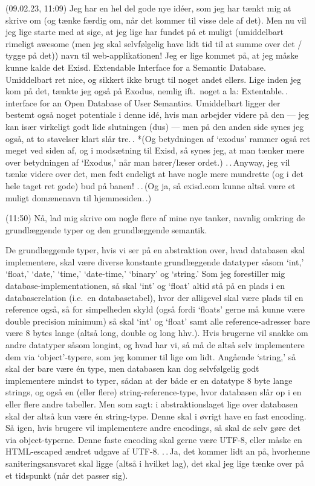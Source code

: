 \documentclass{report}
\begin{document}
(09.02.23, 11:09) Jeg har en hel del gode nye idéer, som jeg har tænkt mig at skrive om (og tænke færdig om, når det kommer til visse dele af det). Men nu vil jeg lige starte med at sige, at jeg lige har fundet på et muligt (umiddelbart rimeligt awesome (men jeg skal selvfølgelig have lidt tid til at summe over det / tygge på det)) navn til web-applikationen! Jeg er lige kommet på, at jeg måske kunne kalde det Exisd. Extendable Interface for a Semantic Database. Umiddelbart ret nice, og sikkert ikke brugt til noget andet ellers. Lige inden jeg kom på det, tænkte jeg også på Exodus, nemlig ift.\ noget a la: Extentable.\,. interface for an Open Database of User Semantics. Umiddelbart ligger der bestemt også noget potentiale i denne idé, hvis man arbejder videre på den --- jeg kan især virkeligt godt lide slutningen (dus) --- men på den anden side synes jeg også, at to stavelser klart slår tre.\,. *(Og betydningen af `exodus' rammer også ret meget ved siden af, og i modsætning til Exisd, så synes jeg, at man tænker mere over betydningen af `Exodus,' når man hører/læser ordet.) .\,.\,Anyway, jeg vil tænke videre over det, men fedt endeligt at have nogle mere mundrette (og i det hele taget ret gode) bud på banen! .\,.\,(Og ja, så exisd.com kunne altså være et muligt domænenavn til hjemmesiden.\,.)

(11:50) Nå, lad mig skrive om nogle flere af mine nye tanker, navnlig omkring de grundlæggende typer og den grundlæggende semantik. 

De grundlæggende typer, hvis vi ser på en abstraktion over, hvad databasen skal implementere, skal være diverse konstante grundlæggende datatyper såsom `int,' `float,' `date,' `time,' `date-time,' `binary' og `string.' Som jeg forestiller mig database-implementationen, så skal `int' og `float' altid stå på en plads i en databaserelation (i.e.\ en databasetabel), hvor der alligevel skal være plads til en reference også, så for simpelheden skyld (også fordi `floats' gerne må kunne være double precision minimum) så skal `int' og `float' samt alle reference-adresser bare være 8 bytes lange (altså long, double og long hhv.). Hvis brugerne vil snakke om andre datatyper såsom longint, og hvad har vi, så må de altså selv implementere dem via `object'-typere, som jeg kommer til lige om lidt. Angående `string,' så skal der bare være én type, men databasen kan dog selvfølgelig godt implementere mindst to typer, sådan at der både er en datatype 8 byte lange strings, og også en (eller flere) string-reference-type, hvor databasen slår op i en eller flere andre tabeller. Men som sagt: i abstraktionslaget lige over databasen skal der altså kun være én string-type. Denne skal i øvrigt have en fast encoding. Så igen, hvis brugere vil implementere andre encodings, så skal de selv gøre det via object-typerne. Denne faste encoding skal gerne være UTF-8, eller måske en HTML-escaped ændret udgave af UTF-8. .\,.\,Ja, det kommer lidt an på, hvorhenne saniteringsansvaret skal ligge (altså i hvilket lag), det skal jeg lige tænke over på et tidspunkt (når det passer sig). 
\end{document}
